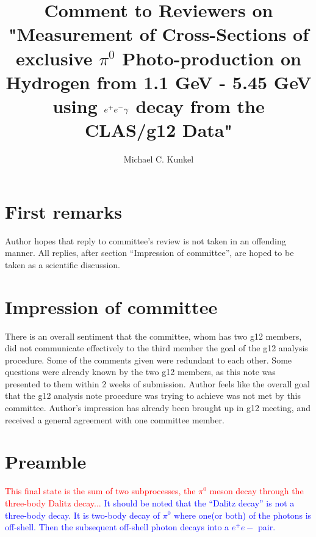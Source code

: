 \documentclass[11pt,a4paper]{article}
\author{Michael C. Kunkel}
\date{}
\title{Comment to Reviewers on "Measurement of Cross-Sections of exclusive $\pi^{0}$ Photo-production on Hydrogen from 1.1 GeV - 5.45 GeV using $\lowercase{e}^{+}\lowercase{e}^{-}\gamma$ decay from the CLAS/g12 Data"}
\begin{document}
\maketitle
\section{First remarks}
Author hopes that reply to committee's review is not taken in an offending manner. All replies, after section ``Impression of committee'', are hoped to be taken as a scientific discussion.
\section{Impression of committee}
There is an overall sentiment that the committee, whom has two g12 members, did not communicate effectively to the third member the goal of the g12 analysis procedure. Some of the comments given were redundant to each other. Some questions were already known by the two g12 members, as this note was presented to them within 2 weeks of submission. Author feels like the overall goal that the g12 analysis note procedure was trying to achieve was not met by this committee. Author's impression has already been brought up in g12 meeting, and received a general agreement with one committee member.
\section*{Preamble}
\textcolor{red}{This final state is the sum of two subprocesses, the $\pi^0$ meson decay through the three-body Dalitz decay...}
\textcolor{blue}{It should be noted that the ``Dalitz decay'' is not a three-body decay. It is  two-body decay of $\pi^0$ where one(or both) of the photons is off-shell. Then the subsequent off-shell photon decays into a $e^+e-$ pair.}
\end{document}
